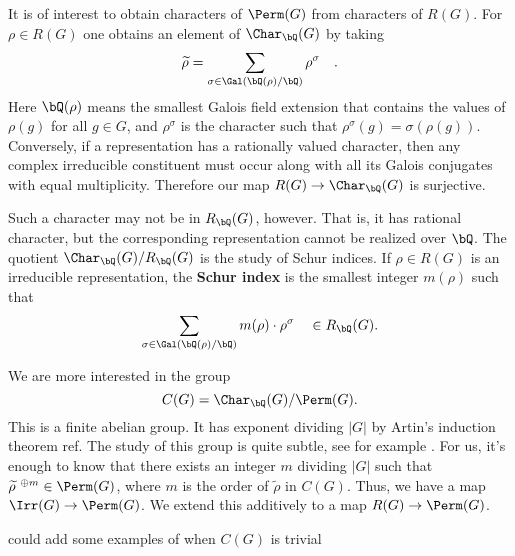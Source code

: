 It is of interest to obtain characters of $\Perm(G)$ from characters of $R(G)$.
For $\rho \in R(G)$ one obtains an element of $\Char_{\bQ}(G)$ by taking 
$$ {\widetilde{\rho}} = \sum_{\sigma \in \Gal(\bQ(\rho)/\bQ)}  \rho^\sigma \quad .$$
Here $\bQ(\rho)$ means the smallest Galois field extension that contains the values of $\rho(g)$ for all $g \in G$, and $\rho^\sigma$ is the character such that $\rho^\sigma(g) = \sigma(\rho(g))$. Conversely, if a representation has a rationally valued character, then any complex irreducible constituent must occur along with all its Galois conjugates with equal multiplicity. Therefore our map $R(G) \to \Char_{\bQ}(G)$ is surjective.

Such a character may not be in $R_{\bQ}(G)$, however. That is, it has rational character, but the corresponding representation cannot be realized over $\bQ$. The quotient $\Char_{\bQ}(G) / R_{\bQ}(G)$ is the study of Schur indices.  If $\rho \in R(G)$ is an irreducible representation, the \textbf{Schur index} is the smallest integer $m(\rho)$ such that 
\[ \sum_{\sigma \in \Gal(\bQ(\rho)/\bQ)}m(\rho) \cdot \rho^\sigma \quad \in R_{\bQ}(G). \]

We are more interested in the group $$C(G) = \Char_{\bQ}(G) / \Perm(G).$$ This is a finite abelian group. It has exponent dividing $|G|$ by Artin's induction theorem {\color{red} ref}. The study of this group is quite subtle, see for example \cite{Tim-Alex}. For us, it's enough to know that there exists an integer $m$ dividing $|G|$ such that $\widetilde{\rho}^{\ \oplus m } \in \Perm(G)$, where $m$ is the order of $\widetilde{\rho}$ in $C(G)$. Thus, we have a map $\Irr(G) \to \Perm(G)$. We extend this additively to a map $R(G) \to \Perm(G)$.

{\color{red} could add some examples of when $C(G)$ is trivial}


